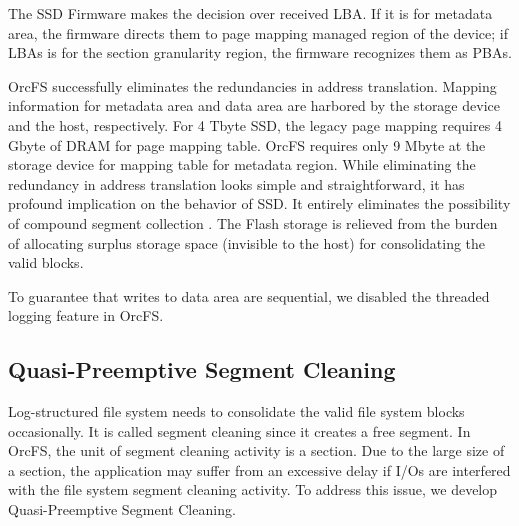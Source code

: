 \documentclass[prodmode,acmtecs]{acmsmall}
\begin{document}
The SSD Firmware makes the decision over received LBA. If it is
for metadata area, the firmware directs them to page mapping managed 
region of the device; if LBAs is for the section granularity region, 
the firmware recognizes them as PBAs.

OrcFS successfully eliminates the redundancies in address translation.
Mapping information for metadata area and data area are harbored by
the storage device and the host, respectively.  For 4 Tbyte SSD, the
legacy page mapping requires 4 Gbyte of DRAM for page mapping
table. OrcFS requires only 9 Mbyte at the storage device for mapping
table for metadata region.  While eliminating the redundancy in
address translation looks simple and straightforward, it has profound
implication on the behavior of SSD. It entirely eliminates the
possibility of compound segment collection \cite{yang2014don}.  The
Flash storage is relieved from the burden of allocating surplus
storage space (invisible to the host) for consolidating the valid
blocks.

To guarantee that writes to data area are sequential, we
disabled the threaded logging feature \cite{oh2010optimizations} in
OrcFS.

\subsection{Quasi-Preemptive Segment Cleaning}



Log-structured file system needs to consolidate the valid file system
blocks occasionally. It is called segment cleaning since it creates a
free segment. In OrcFS, the unit of segment cleaning activity is a
section. Due to the large size of a section, the application may
suffer from an excessive delay if I/Os are interfered with the
file system segment cleaning activity. To address this issue, we
develop Quasi-Preemptive Segment Cleaning.
\end{document}
